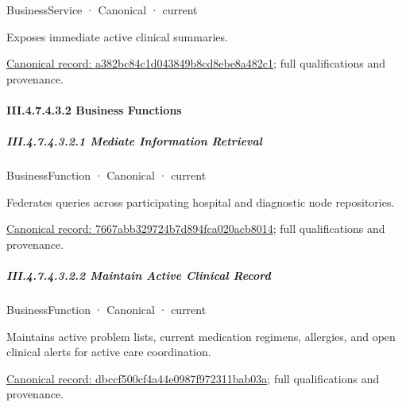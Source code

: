 \label{element:a382bc84c1d043849b8cd8ebe8a482c1}
{\small BusinessService · Canonical · current}\par

Exposes immediate active clinical summaries.


{\footnotesize \href{../../../../../../../../continuum/business/business-service/a382bc84c1d043849b8cd8ebe8a482c1.md}{Canonical record: a382bc84c1d043849b8cd8ebe8a482c1}; full qualifications and provenance.}\par
\paragraph*{III.4.7.4.3.2 Business Functions}
\label{navigation:III.4.7.4.3.2}

\subparagraph*{III.4.7.4.3.2.1 Mediate Information Retrieval}
\label{navigation:III.4.7.4.3.2.1}

\label{element:7667abb329724b7d894fca020acb8014}
{\small BusinessFunction · Canonical · current}\par

Federates queries across participating hospital and diagnostic node repositories.


{\footnotesize \href{../../../../../../../../continuum/business/business-function/7667abb329724b7d894fca020acb8014.md}{Canonical record: 7667abb329724b7d894fca020acb8014}; full qualifications and provenance.}\par
\subparagraph*{III.4.7.4.3.2.2 Maintain Active Clinical Record}
\label{navigation:III.4.7.4.3.2.2}

\label{element:dbccf500cf4a44e0987f972311bab03a}
{\small BusinessFunction · Canonical · current}\par

Maintains active problem lists, current medication regimens, allergies, and open clinical alerts for active care coordination.


{\footnotesize \href{../../../../../../../../continuum/business/business-function/dbccf500cf4a44e0987f972311bab03a.md}{Canonical record: dbccf500cf4a44e0987f972311bab03a}; full qualifications and provenance.}\par
